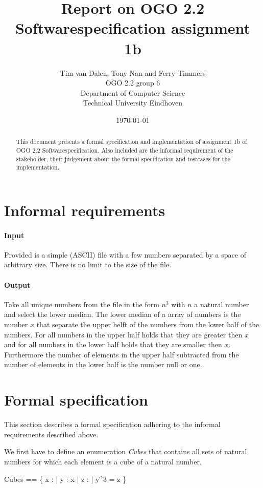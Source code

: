 \documentclass[12pt]{article}
\title{Report on OGO 2.2 Softwarespecification assignment 1b}
\author{
        Tim van Dalen, Tony Nan and Ferry Timmers\\ OGO 2.2 group 6 \\
                Department of Computer Science\\
        Technical University Eindhoven\\
}
\date{\today}
\begin{document}
\maketitle

\begin{abstract}
This document presents a formal specification and implementation of assignment 1b of OGO 2.2 Softwarespecification. Also included are the informal requirement of the stakeholder, their judgement about the formal specification and testcases for the implementation.
\end{abstract}

\section{Informal requirements}
\paragraph{Input} Provided is a simple (ASCII) file with a few numbers separated by a space of arbitrary size. There is no limit to the size of the file.
\paragraph{Output} Take all unique numbers from the file in the form $n^3$ with $n$ a natural number and select the lower median. The lower median of a array of numbers is the number $x$ that separate the upper helft of the numbers from the lower half of the numbers. For all numbers in the upper half holds that they are greater then $x$ and for all numbers in the lower half holds that they are smaller then $x$. Furthermore the number of elements in the upper half subtracted from the number of elements in the lower half is the number null or one.

\section{Formal specification}

This section describes a formal specification adhering to the informal requirements described above.

We first have to define an enumeration \textit{Cubes} that contains all sets of natural numbers for which each element is a cube of a natural number.
\begin{axdef}
Cubes == \{ x : \power \nat | \forall y : x | \exists z : \nat | y^3 = z \}
\end{axdef}
\end{document}
